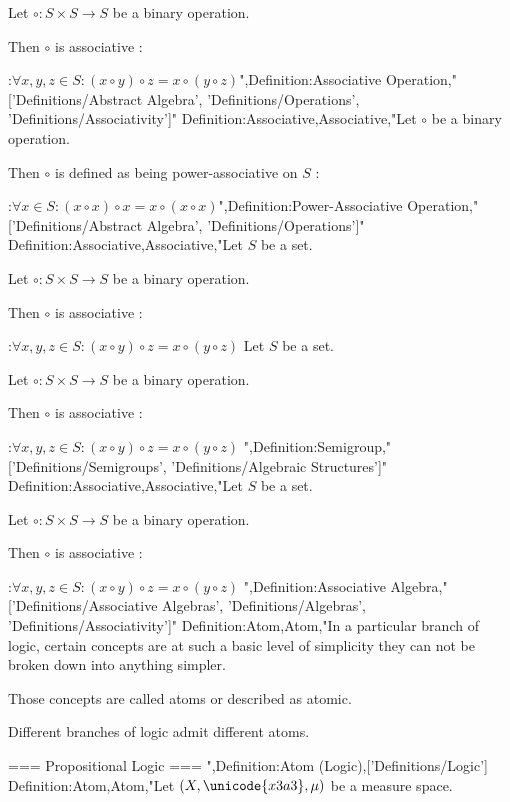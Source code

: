 Let $\circ : S \times S \to S$ be a binary operation.


Then $\circ$ is associative :

:$\forall x, y, z \in S: \left( x \circ y \right) \circ z = x \circ \left( y \circ z \right)$",Definition:Associative Operation,"['Definitions/Abstract Algebra', 'Definitions/Operations', 'Definitions/Associativity']"
Definition:Associative,Associative,"Let $\circ$ be a binary operation.

Then $\circ$ is defined as being power-associative on $S$ :

:$\forall x \in S: \left( x \circ x \right) \circ x = x \circ \left( x \circ x \right)$",Definition:Power-Associative Operation,"['Definitions/Abstract Algebra', 'Definitions/Operations']"
Definition:Associative,Associative,"Let $S$ be a set.

Let $\circ : S \times S \to S$ be a binary operation.


Then $\circ$ is associative :

:$\forall x, y, z \in S: \left( x \circ y \right) \circ z = x \circ \left( y \circ z \right)$
Let $S$ be a set.

Let $\circ : S \times S \to S$ be a binary operation.


Then $\circ$ is associative :

:$\forall x, y, z \in S: \left( x \circ y \right) \circ z = x \circ \left( y \circ z \right)$
",Definition:Semigroup,"['Definitions/Semigroups', 'Definitions/Algebraic Structures']"
Definition:Associative,Associative,"Let $S$ be a set.

Let $\circ : S \times S \to S$ be a binary operation.


Then $\circ$ is associative :

:$\forall x, y, z \in S: \left( x \circ y \right) \circ z = x \circ \left( y \circ z \right)$
",Definition:Associative Algebra,"['Definitions/Associative Algebras', 'Definitions/Algebras', 'Definitions/Associativity']"
Definition:Atom,Atom,"In a particular branch of logic, certain concepts are at such a basic level of simplicity they can not be broken down into anything simpler.

Those concepts are called atoms or described as atomic.


Different branches of logic admit different atoms.


=== Propositional Logic ===
",Definition:Atom (Logic),['Definitions/Logic']
Definition:Atom,Atom,"Let $\left( X, \unicode{x3a3}, \mu \right)$ be a measure space.


